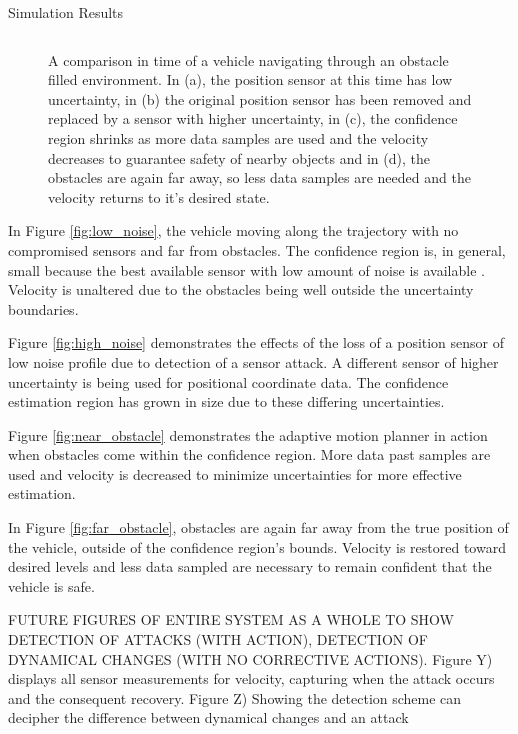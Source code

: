 \begin{section}{Simulation Results}
\begin{figure}[b!th]
\begin{tabular}{cccc}
\end{tabular}
\caption{A comparison in time of a vehicle navigating through an obstacle filled environment. In (a), the position sensor at this time has low uncertainty, in (b) the original position sensor has been removed and replaced by a sensor with higher uncertainty, in (c), the confidence region shrinks as more data samples are used and the velocity decreases to guarantee safety of nearby objects and in (d), the obstacles are again far away, so less data samples are needed and the velocity returns to it's desired state. }

\end{figure}

In Figure \ref{fig:low_noise}, the vehicle moving along the trajectory with no compromised sensors and far from obstacles. The confidence region is, in general, small because the best available sensor with low amount of noise is available . Velocity is unaltered due to the obstacles being well outside the uncertainty boundaries.

Figure \ref{fig:high_noise} demonstrates the effects of the loss of a position sensor of low noise profile due to detection of a sensor attack. A different sensor of higher uncertainty is being used for positional coordinate data. The confidence estimation region has grown in size due to these differing uncertainties.

Figure \ref{fig:near_obstacle} demonstrates the adaptive motion planner in action when obstacles come within the confidence region. More data past samples are used and velocity is decreased to minimize uncertainties for more effective estimation.

In Figure \ref{fig:far_obstacle}, obstacles are again far away from the true position of the vehicle, outside of the confidence region's bounds. Velocity is restored toward desired levels and less data sampled are necessary to remain confident that the vehicle is safe.


FUTURE FIGURES OF ENTIRE SYSTEM AS A WHOLE TO SHOW DETECTION OF ATTACKS (WITH ACTION), DETECTION OF DYNAMICAL CHANGES (WITH NO CORRECTIVE ACTIONS).
Figure Y) displays all sensor measurements for velocity, capturing when the attack occurs and the consequent recovery. 
Figure Z) Showing the detection scheme can decipher the difference between dynamical changes and an attack



\end{section}
